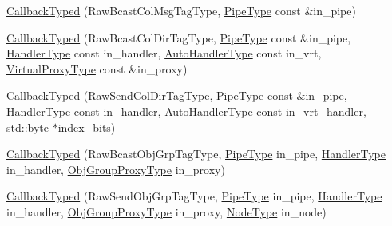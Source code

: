 \begin{DoxyCompactItemize}
\item 
\hyperlink{structvt_1_1pipe_1_1callback_1_1cbunion_1_1_callback_typed_a36657b73ab1715cf79691e7a2ddb83e1}{Callback\+Typed} (Raw\+Bcast\+Col\+Msg\+Tag\+Type, \hyperlink{namespacevt_ac9852acda74d1896f48f406cd72c7bd3}{Pipe\+Type} const \&in\+\_\+pipe)
\item 
\hyperlink{structvt_1_1pipe_1_1callback_1_1cbunion_1_1_callback_typed_a53449646d77256c5ecb4deba498cac60}{Callback\+Typed} (Raw\+Bcast\+Col\+Dir\+Tag\+Type, \hyperlink{namespacevt_ac9852acda74d1896f48f406cd72c7bd3}{Pipe\+Type} const \&in\+\_\+pipe, \hyperlink{namespacevt_af64846b57dfcaf104da3ef6967917573}{Handler\+Type} const in\+\_\+handler, \hyperlink{structvt_1_1pipe_1_1callback_1_1cbunion_1_1_callback_raw_base_single_a734a9c83099de5bc1cd85f9da8dba7bb}{Auto\+Handler\+Type} const in\+\_\+vrt, \hyperlink{namespacevt_a1b417dd5d684f045bb58a0ede70045ac}{Virtual\+Proxy\+Type} const \&in\+\_\+proxy)
\item 
\hyperlink{structvt_1_1pipe_1_1callback_1_1cbunion_1_1_callback_typed_a1794176a2bb6afd876b78a0ecd09dd12}{Callback\+Typed} (Raw\+Send\+Col\+Dir\+Tag\+Type, \hyperlink{namespacevt_ac9852acda74d1896f48f406cd72c7bd3}{Pipe\+Type} const \&in\+\_\+pipe, \hyperlink{namespacevt_af64846b57dfcaf104da3ef6967917573}{Handler\+Type} const in\+\_\+handler, \hyperlink{structvt_1_1pipe_1_1callback_1_1cbunion_1_1_callback_raw_base_single_a734a9c83099de5bc1cd85f9da8dba7bb}{Auto\+Handler\+Type} const in\+\_\+vrt\+\_\+handler, std\+::byte $\ast$index\+\_\+bits)
\item 
\hyperlink{structvt_1_1pipe_1_1callback_1_1cbunion_1_1_callback_typed_a5ac854c689dea58e9063903a460d8f9d}{Callback\+Typed} (Raw\+Bcast\+Obj\+Grp\+Tag\+Type, \hyperlink{namespacevt_ac9852acda74d1896f48f406cd72c7bd3}{Pipe\+Type} in\+\_\+pipe, \hyperlink{namespacevt_af64846b57dfcaf104da3ef6967917573}{Handler\+Type} in\+\_\+handler, \hyperlink{namespacevt_ad7cae989df485fccca57f0792a880a8e}{Obj\+Group\+Proxy\+Type} in\+\_\+proxy)
\item 
\hyperlink{structvt_1_1pipe_1_1callback_1_1cbunion_1_1_callback_typed_aa4dab73febea8b4e76bf20881fb9993d}{Callback\+Typed} (Raw\+Send\+Obj\+Grp\+Tag\+Type, \hyperlink{namespacevt_ac9852acda74d1896f48f406cd72c7bd3}{Pipe\+Type} in\+\_\+pipe, \hyperlink{namespacevt_af64846b57dfcaf104da3ef6967917573}{Handler\+Type} in\+\_\+handler, \hyperlink{namespacevt_ad7cae989df485fccca57f0792a880a8e}{Obj\+Group\+Proxy\+Type} in\+\_\+proxy, \hyperlink{namespacevt_a866da9d0efc19c0a1ce79e9e492f47e2}{Node\+Type} in\+\_\+node)
\item 

\end{DoxyCompactItemize}
